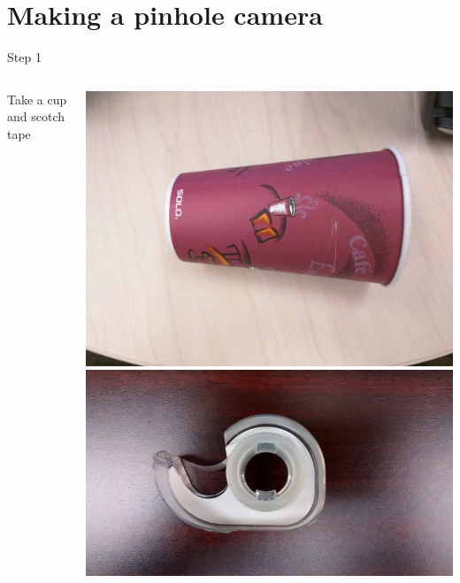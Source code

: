 \section{Making a pinhole camera}
\begin{frame}{Step 1}
  \begin{columns}
    \begin{column}{0.4\textwidth}
      Take a cup and scotch tape
    \end{column}
    \begin{column}{0.6\textwidth}
      \includegraphics[width=\textwidth,trim=0 1in 0 1in,clip]{media/plain-cup.jpg}\\
      \includegraphics[width=\textwidth]{media/tape.jpg}
    \end{column}
  \end{columns}
\end{frame}

